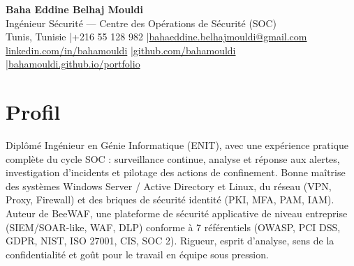 \documentclass[a4paper,9pt]{article}
\begin{document}
\begin{center}
{\LARGE\bfseries\color{navy} Baha Eddine Belhaj Mouldi}\\[2pt]
{\normalsize\color{navy} Ingénieur Sécurité --- Centre des Opérations de Sécurité (SOC)}\\[3pt]
{\small Tunis, Tunisie \quad|\quad +216 55 128 982 \quad|\quad \href{mailto:bahaeddine.belhajmouldi@gmail.com}{bahaeddine.belhajmouldi@gmail.com}}\\[1pt]
{\small \href{https://www.linkedin.com/in/bahamouldi}{linkedin.com/in/bahamouldi} \quad|\quad \href{https://github.com/bahamouldi}{github.com/bahamouldi} \quad|\quad \href{https://bahamouldi.github.io/portfolio/}{bahamouldi.github.io/portfolio}}
\end{center}
\vspace{1pt}
\section{Profil}
Diplômé Ingénieur en Génie Informatique (ENIT), avec une expérience pratique complète du cycle SOC : surveillance continue, analyse et réponse aux alertes, investigation d'incidents et pilotage des actions de confinement. Bonne maîtrise des systèmes Windows Server / Active Directory et Linux, du réseau (VPN, Proxy, Firewall) et des briques de sécurité identité (PKI, MFA, PAM, IAM). Auteur de BeeWAF, une plateforme de sécurité applicative de niveau entreprise (SIEM/SOAR-like, WAF, DLP) conforme à 7 référentiels (OWASP, PCI DSS, GDPR, NIST, ISO 27001, CIS, SOC 2). Rigueur, esprit d'analyse, sens de la confidentialité et goût pour le travail en équipe sous pression.
\end{document}

